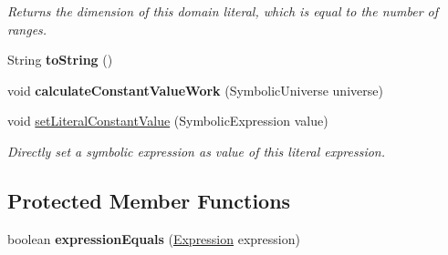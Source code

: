 \begin{DoxyCompactItemize}
\begin{DoxyCompactList}\small\item\em Returns the dimension of this domain literal, which is equal to the number of ranges. \end{DoxyCompactList}\item 
\hypertarget{classedu_1_1udel_1_1cis_1_1vsl_1_1civl_1_1model_1_1common_1_1expression_1_1CommonRecDomainLiteralExpression_a8b5d466eb8a84cfa6d246726d4c62678}{}String {\bfseries to\+String} ()\label{classedu_1_1udel_1_1cis_1_1vsl_1_1civl_1_1model_1_1common_1_1expression_1_1CommonRecDomainLiteralExpression_a8b5d466eb8a84cfa6d246726d4c62678}

\item 
\hypertarget{classedu_1_1udel_1_1cis_1_1vsl_1_1civl_1_1model_1_1common_1_1expression_1_1CommonRecDomainLiteralExpression_abac865ccbda2a9340a2f51e3e04c242c}{}void {\bfseries calculate\+Constant\+Value\+Work} (Symbolic\+Universe universe)\label{classedu_1_1udel_1_1cis_1_1vsl_1_1civl_1_1model_1_1common_1_1expression_1_1CommonRecDomainLiteralExpression_abac865ccbda2a9340a2f51e3e04c242c}

\item 
void \hyperlink{classedu_1_1udel_1_1cis_1_1vsl_1_1civl_1_1model_1_1common_1_1expression_1_1CommonRecDomainLiteralExpression_a70af5026d01ba66ae2fb23c56a34ddc4}{set\+Literal\+Constant\+Value} (Symbolic\+Expression value)
\begin{DoxyCompactList}\small\item\em Directly set a symbolic expression as value of this literal expression. \end{DoxyCompactList}\end{DoxyCompactItemize}
\subsection*{Protected Member Functions}
\begin{DoxyCompactItemize}
\item 
\hypertarget{classedu_1_1udel_1_1cis_1_1vsl_1_1civl_1_1model_1_1common_1_1expression_1_1CommonRecDomainLiteralExpression_a55234f4c8254c7bf6d52ed3b39d83f15}{}boolean {\bfseries expression\+Equals} (\hyperlink{interfaceedu_1_1udel_1_1cis_1_1vsl_1_1civl_1_1model_1_1IF_1_1expression_1_1Expression}{Expression} expression)\label{classedu_1_1udel_1_1cis_1_1vsl_1_1civl_1_1model_1_1common_1_1expression_1_1CommonRecDomainLiteralExpression_a55234f4c8254c7bf6d52ed3b39d83f15}

\end{DoxyCompactItemize}
